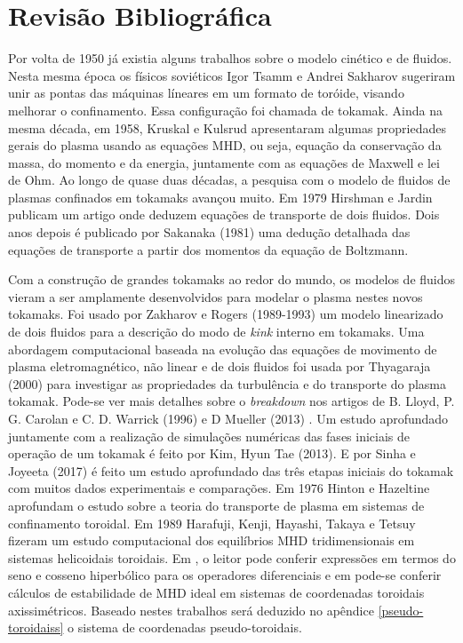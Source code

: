 \documentclass[12pt,oneside,a4paper]{abntex2}
\begin{document}
\chapter{Revisão Bibliográfica}
\noindent Por volta de 1950 já existia alguns trabalhos sobre o modelo cinético e de fluidos. 
Nesta mesma época os físicos soviéticos Igor Tsamm e Andrei Sakharov sugeriram unir as pontas das máquinas líneares em um formato de toróide, visando melhorar o confinamento. 
Essa configuração foi chamada de tokamak. 
Ainda na mesma década, em 1958, Kruskal e  Kulsrud \cite{Kruskal1958} apresentaram algumas propriedades gerais do plasma usando as equações MHD, ou seja, equação da conservação da massa, do momento e da energia, juntamente com as equações de Maxwell e lei de Ohm. 
Ao longo de quase duas décadas, a pesquisa com o modelo de fluidos de plasmas confinados em tokamaks avançou muito. 
Em 1979 Hirshman e Jardin \cite{hirshman} publicam um artigo onde deduzem equações de transporte de dois fluidos. 
Dois anos depois é publicado por Sakanaka (1981) \cite{Sakanaka1981} uma dedução detalhada das equações de transporte a partir dos momentos da equação de Boltzmann. 

Com a construção de grandes tokamaks ao redor do mundo, os modelos de fluidos vieram a ser amplamente desenvolvidos para modelar o plasma nestes novos tokamaks. 
Foi usado por Zakharov e Rogers (1989-1993) \cite{Zakharov} um modelo linearizado de dois fluidos para a descrição do modo de \textit{kink} interno em tokamaks. 
Uma abordagem computacional baseada na evolução das equações de movimento de plasma eletromagnético, não linear e de dois fluidos foi usada por Thyagaraja (2000) \cite{Thyagaraja_2000} para investigar as propriedades da turbulência e do transporte do plasma tokamak. 
Pode-se ver mais detalhes sobre o \textit{breakdown} nos artigos de B. Lloyd, P. G. Carolan e C. D. Warrick (1996) \cite{breacdown} e D Mueller (2013) \cite{breacdown2}. 
Um estudo aprofundado juntamente com a realização de simulações numéricas das fases iniciais de operação de um tokamak é feito por Kim, Hyun Tae  \cite{kim2013physics} (2013). E por Sinha e Joyeeta \cite{sinha2017plasma} (2017) é feito um estudo aprofundado das três etapas iniciais do tokamak com muitos dados experimentais e comparações.  Em 1976 Hinton e Hazeltine \cite{RevModPhys.48.239} aprofundam o estudo sobre a teoria do transporte de plasma em sistemas de confinamento toroidal. Em 1989 Harafuji, Kenji, Hayashi, Takaya e Tetsuy \cite{harafuji1989computational} fizeram um estudo computacional dos equilíbrios MHD tridimensionais em sistemas helicoidais toroidais. Em \cite{weisstein2003toroidal}, o leitor pode conferir expressões em termos do seno e cosseno hiperbólico para os operadores diferenciais e em \cite{grimm1983ideal} pode-se conferir cálculos de estabilidade de MHD ideal em sistemas de coordenadas toroidais axissimétricos. Baseado nestes trabalhos será deduzido no apêndice \ref{pseudo-toroidaiss} o sistema de coordenadas pseudo-toroidais.
\end{document}
